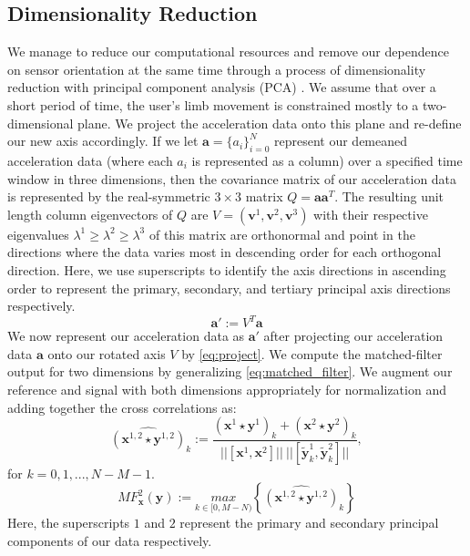 \documentclass{sciposter}
\begin{document}
\begin{multicols}{3}
\section{Dimensionality Reduction}
We manage to reduce our computational resources and remove our dependence on sensor orientation at the same time through a process of dimensionality reduction with principal component analysis (PCA) \cite{bishop_2006}.
We assume that over a short period of time, the user's limb movement is constrained mostly to a two-dimensional plane.
We project the acceleration data onto this plane and re-define our new axis accordingly.
If we let $\textbf{a} = \{a_i\}_{i=0}^{N}$ represent our demeaned acceleration data (where each $a_i$ is represented as a column) over a specified time window in three dimensions, then the covariance matrix of our acceleration data is represented by the real-symmetric $3 \times 3$ matrix $Q = \textbf{a} \textbf{a}^T$.
The resulting unit length column eigenvectors of $Q$ are $V = (\textbf{v}^1,\textbf{v}^2,\textbf{v}^3)$ with their respective eigenvalues $\lambda^1 \geq \lambda^2 \geq \lambda^3$ of this matrix are orthonormal and point in the directions where the data varies most in descending order for each orthogonal direction.
Here, we use superscripts to identify the axis directions in ascending order to represent the primary, secondary, and tertiary principal axis directions respectively.
%
\begin{equation} \label{eq:project}
   \textbf{a}' := V^T \textbf{a}
\end{equation}
%
We now represent our acceleration data as $\textbf{a}'$ after projecting our acceleration data $\textbf{a}$ onto our rotated axis $V$ by \eqref{eq:project}.
We compute the matched-filter output for two dimensions by generalizing \eqref{eq:matched_filter}.
We augment our reference and signal with both dimensions appropriately for normalization and adding together the cross correlations as:
%
\begin{equation} \label{eq:cross_correlation_2}
\widehat{(\textbf{x}^{1,2} \star \textbf{y}^{1,2})}_k := \frac{(\textbf{x}^1 \star \textbf{y}^1)_k + (\textbf{x}^2 \star \textbf{y}^2)_k}{||[ \textbf{x}^1, \textbf{x}^2 ]|| \ || [ \widetilde{\textbf{y}}_k^1, \widetilde{\textbf{y}}_k^2 ] || },
\end{equation}
%
for $ k = 0,1,...,N-M-1 $. \\
%
\begin{equation} \label{eq:matched_filter_2}
MF_{\textbf{x}}^2(\textbf{y}) := \underset{k \in [0, M-N)}{max} \left \{\widehat{(\textbf{x}^{1,2} \star \textbf{y}^{1,2})}_k \right \}
\end{equation}
%
Here, the superscripts $1$ and $2$ represent the primary and secondary principal components of our data respectively.


\end{multicols}
\end{document}
